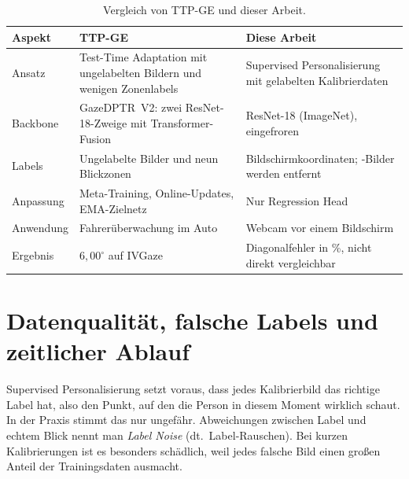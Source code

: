 \begin{table}[htbp]
  \centering
  \small
  \caption{Vergleich von TTP-GE und dieser Arbeit.}
  \label{tab:ttpge_vergleich}
  \begin{tabularx}{\textwidth}{L{3.0cm} Y Y}
    \toprule
    \textbf{Aspekt} & \textbf{TTP-GE~\cite{nagpure2025ttpge}} & \textbf{Diese Arbeit} \\
    \midrule
    Ansatz & Test-Time Adaptation mit ungelabelten Bildern und wenigen Zonenlabels & Supervised Personalisierung mit gelabelten Kalibrierdaten \\
    Backbone & GazeDPTR~V2: zwei ResNet-18-Zweige mit Transformer-Fusion & ResNet-18 (ImageNet), eingefroren \\
    Labels & Ungelabelte Bilder und neun Blickzonen & Bildschirmkoordinaten; -Bilder werden entfernt \\
    Anpassung & Meta-Training, Online-Updates, EMA-Zielnetz & Nur Regression Head \\
    Anwendung & Fahrerüberwachung im Auto & Webcam vor einem Bildschirm \\
    Ergebnis & $6,00^\circ$ auf IVGaze & Diagonalfehler in \%, nicht direkt vergleichbar \\
    \bottomrule
  \end{tabularx}
\end{table}

\section{Datenqualität, falsche Labels und zeitlicher Ablauf}
\label{sec:label_noise}
Supervised Personalisierung setzt voraus, dass jedes Kalibrierbild das
richtige Label hat, also den Punkt, auf den die Person in diesem Moment
wirklich schaut. In der Praxis stimmt das nur ungefähr. Abweichungen zwischen
Label und echtem Blick nennt man \emph{Label Noise} (dt.\ Label-Rauschen). Bei kurzen
Kalibrierungen ist es besonders schädlich, weil jedes falsche Bild einen
großen Anteil der Trainingsdaten ausmacht.

